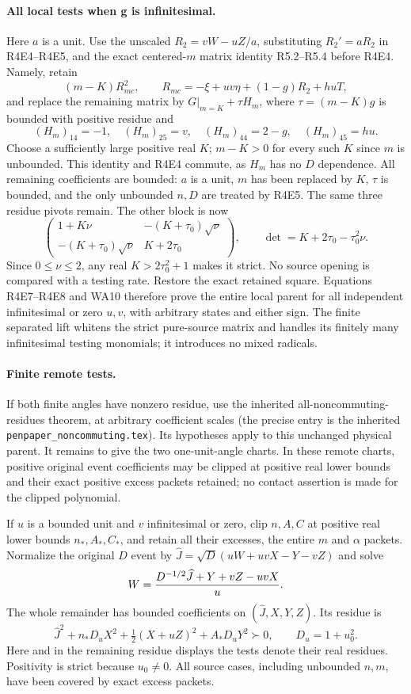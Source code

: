 \paragraph{All local tests when g is infinitesimal.}
Here $a$ is a unit. Use the unscaled $R_2=vW-uZ/a$, substituting
$R_2'=aR_2$ in R4E4--R4E5, and the exact
centered-$m$ matrix identity R5.2--R5.4 before R4E4. Namely, retain
\[
 (m-K)R_{mc}^2,\qquad R_{mc}=-\xi+uv\eta+(1-g)R_2+huT,
\]
and replace the remaining matrix by
$G|_{m=K}+\tau H_m$, where $\tau=(m-K)g$ is bounded with positive
residue and
\[
 (H_m)_{14}=-1,\quad(H_m)_{25}=v,\quad
 (H_m)_{44}=2-g,\quad(H_m)_{45}=hu.
\]
Choose a sufficiently large positive real $K$; $m-K>0$ for every
such $K$ since $m$ is unbounded. This identity and R4E4 commute,
as $H_m$ has no $D$ dependence. All remaining coefficients are
bounded: $a$ is a unit, $m$ has been replaced by $K$, $\tau$ is
bounded, and the only unbounded $n,D$ are treated by R4E5.
The same three residue pivots remain. The other block is now
\[
 \begin{pmatrix}
 1+K\nu&-(K+\tau_0)\sqrt\nu\\
 -(K+\tau_0)\sqrt\nu&K+2\tau_0
 \end{pmatrix},\qquad
 \det=K+2\tau_0-\tau_0^2\nu.                         \tag{R4E8}
\]
Since $0\le\nu\le2$, any real $K>2\tau_0^2+1$ makes it strict.
No source opening is compared with a testing rate. Restore the exact
retained square. Equations R4E7--R4E8 and WA10 therefore prove the
entire local parent for all independent infinitesimal or zero $u,v$,
with arbitrary states and either sign. The finite separated lift
whitens the strict pure-source matrix and handles its finitely many
infinitesimal testing monomials; it introduces no mixed radicals.

\paragraph{Finite remote tests.}
If both finite angles have nonzero residue, use the inherited
all-noncommuting-residues theorem, at arbitrary coefficient scales
(the precise entry is the inherited \texttt{penpaper\_noncommuting.tex}).
Its hypotheses apply to this unchanged physical parent. It remains
to give the two one-unit-angle charts. In these remote charts,
positive original event coefficients may be clipped at positive real
lower bounds and their exact positive excess packets retained; no
contact assertion is made for the clipped polynomial.

If $u$ is a bounded unit and $v$ infinitesimal or zero, clip $n,A,C$
at positive real lower bounds $n_*,A_*,C_*$, and retain all their
excesses, the entire $m$ and $\alpha$ packets. Normalize the original
$D$ event by $\widehat J=\sqrt D(uW+uvX-Y-vZ)$ and solve
\[
 W={D^{-1/2}\widehat J+Y+vZ-uvX\over u}.
\]
The whole remainder has bounded coefficients on
$(\widehat J,X,Y,Z)$. Its residue is
\[
 \widehat J^2+n_*D_uX^2+\tfrac12(X+uZ)^2+A_*D_uY^2\succ0,
 \qquad D_u=1+u_0^2.                                \tag{R4E9}
\]
Here and in the remaining residue displays the tests denote their real
residues. Positivity is strict because $u_0\ne0$. All source cases,
including unbounded $n,m$, have been covered by exact excess packets.


